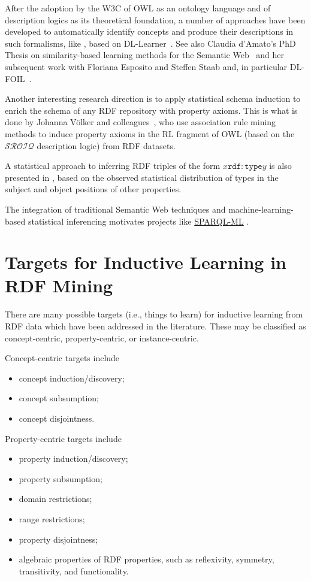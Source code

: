 \documentclass[a4paper]{article}
\newcounter{ex}
\begin{document}
After the adoption by the W3C of OWL as an ontology language and of description logics
as its theoretical foundation, a number of approaches have been developed to automatically
identify concepts and produce their descriptions in such formalisms, like
\cite{HellmannLehmannAuer2009}, based on DL-Learner~\cite{Lehmann2009}.
See also Claudia d'Amato's PhD Thesis on similarity-based learning
methods for the Semantic Web~\cite{dAmato2007} and her subsequent work with
Floriana Esposito and Steffen Staab and, in particular DL-FOIL~\cite{FanizziDAmatoEsposito2008}.

Another interesting research direction is to apply statistical schema induction
to enrich the schema of any RDF repository with property axioms. This is what is
done by Johanna V\"olker and colleagues~\cite{FleischhackerVoelkerStuckenschmidt2012},
who use association rule mining methods to induce property axioms in the RL fragment
of OWL (based on the $\mathcal{SROIQ}$ description logic) from RDF datasets.

A statistical approach to inferring RDF triples of the form $x \mathtt{rdf:type} y$
is also presented in \cite{PaulheimBizer2013}, based on the observed statistical
distribution of types in the subject and object positions of other properties.

The integration of traditional Semantic Web techniques and machine-learning-based
statistical inferencing motivates projects like
\href{https://files.ifi.uzh.ch/ddis/oldweb/ddis/research/completed-projects/semweb/sparql-ml/}{SPARQL-ML} \cite{KieferBernsteinLocher2008}.

\section{Targets for Inductive Learning in RDF Mining}

There are many possible targets (i.e., things to learn) for inductive learning from RDF data
which have been addressed in the literature.
These may be classified as concept-centric, property-centric, or instance-centric.

Concept-centric targets include
\begin{itemize}
\item concept induction/discovery;
\item concept subsumption;
\item concept disjointness.
\end{itemize}

Property-centric targets include
\begin{itemize}
\item property induction/discovery;
\item property subsumption;
\item domain restrictions;
\item range restrictions;
\item property disjointness;
\item algebraic properties of RDF properties, such as reflexivity, symmetry, transitivity,
  and functionality.
\end{itemize}
\end{document}
